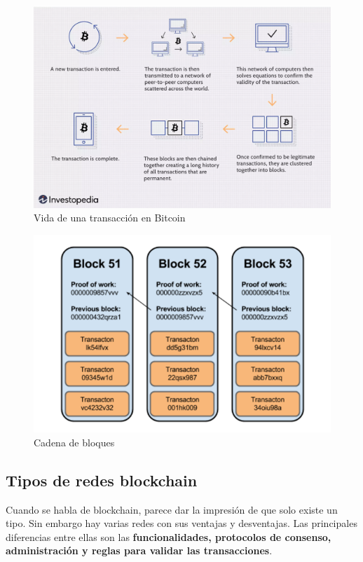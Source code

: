 \begin{figure}[h!]
  \centering
  \includegraphics[width=0.8\linewidth]{figs/EstadoArte/Blockchain/bitcoinMining}
  \caption[Vida de una transacción en Bitcoin]{Vida de una transacción en Bitcoin}
  \label{fig:bitcoin}
\end{figure}

\begin{figure}[h!]
  \centering
  \includegraphics[width=0.8\linewidth]{figs/EstadoArte/Blockchain/bloqueEnlazado}
  \caption[Cadena de bloques]{Cadena de bloques}
  \label{fig:bloqueEnlazado}
\end{figure}

\subsection{Tipos de redes blockchain}

Cuando se habla de blockchain, parece dar la impresión de que solo existe un tipo. Sin embargo hay varias redes con sus ventajas y desventajas\cite{tiposBlock1, tiposBlock2}. Las principales diferencias entre ellas son las \textbf{funcionalidades, protocolos de consenso, administración y reglas para validar las transacciones}.

